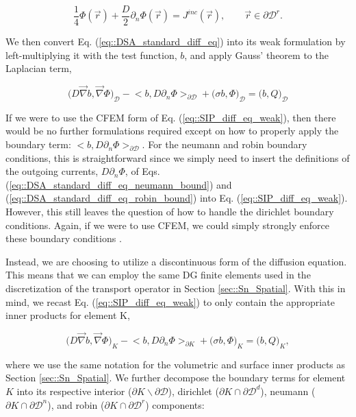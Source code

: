 \begin{equation}
\label{eq::DSA_standard_diff_eq_robin_bound}
\frac{1}{4}\Phi (\vec{r}) + \frac{D}{2} \partial_n \Phi (\vec{r}) = J^{inc} (\vec{r}), \qquad \vec{r} \in \partial \mathcal{D}^r .
\end{equation}

\noindent We then convert Eq. (\ref{eq::DSA_standard_diff_eq}) into its weak formulation by left-multiplying it with the test function, $b$, and apply Gauss' theorem to the Laplacian term,

\begin{equation}
\label{eq::SIP_diff_eq_weak}
\Big(  D \vec{\nabla}  b , \vec{\nabla} \Phi  \Big)_{\mathcal{D}} - \Big<  b, D \partial_n \Phi \Big>_{\partial \mathcal{D}} + \Big(  \sigma   b ,  \Phi  \Big)_{\mathcal{D}}  = \Big(  b, Q  \Big)_{\mathcal{D}}
\end{equation}

\noindent If we were to use the CFEM form of Eq. (\ref{eq::SIP_diff_eq_weak}), then there would be no further formulations required except on how to properly apply the boundary term: $\Big<  b, D \partial_n \Phi \Big>_{\partial \mathcal{D}}$. For the neumann and robin boundary conditions, this is straightforward since we simply need to insert the definitions of the outgoing currents, $ D \partial_n \Phi$, of Eqs. (\ref{eq::DSA_standard_diff_eq_neumann_bound}) and (\ref{eq::DSA_standard_diff_eq_robin_bound}) into Eq. (\ref{eq::SIP_diff_eq_weak}). However, this still leaves the question of how to handle the dirichlet boundary conditions. Again, if we were to use CFEM, we could simply strongly enforce these boundary conditions \cite{akin1982application}.

Instead, we are choosing to utilize a discontinuous form of the diffusion equation. This means that we can employ the same DG finite elements used in the discretization of the transport operator in Section \ref{sec::Sn_Spatial}. With this in mind, we recast Eq. (\ref{eq::SIP_diff_eq_weak}) to only contain the appropriate inner products for element K,

\begin{equation}
\label{eq::SIP_diff_eq_weak_cellK}
\Big(  D \vec{\nabla}  b , \vec{\nabla} \Phi  \Big)_{K} - \Big<  b, D \partial_n \Phi \Big>_{\partial K} + \Big(  \sigma   b ,  \Phi  \Big)_{K}  = \Big(  b, Q  \Big)_{K} ,
\end{equation}

\noindent where we use the same notation for the volumetric and surface inner products as Section \ref{sec::Sn_Spatial}. We further decompose the boundary terms for element $K$ into its respective interior ($\partial K \backslash \partial \mathcal{D}$), dirichlet ($\partial	K \cap \partial \mathcal{D}^d$), neumann ($\partial	K \cap \partial \mathcal{D}^n$), and robin ($\partial	K \cap \partial \mathcal{D}^r$) components:

